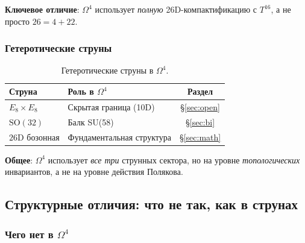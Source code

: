 \documentclass[11pt,a4paper]{article}
\newcommand{\SO}{\ensuremath{\mathrm{SO}}}
\newcommand{\Om}{\ensuremath{\Omega^4}}
\theoremstyle{definition}
\begin{document}
\medskip\noindent
\textbf{Ключевое отличие}: $\Om$ использует \emph{полную}
26D-компактификацию с $T^{16}$, а не просто $26 = 4 + 22$.

\subsubsection{Гетеротические струны}

\begin{table}[ht]
\centering
\caption{Гетеротические струны в \texorpdfstring{$\Om$}{}.}
\label{tab:string-heterotic}
\begin{tabular}{llc}
\toprule
Струна & Роль в $\Om$ & Раздел \\
\midrule
$E_8 \times E_8$ & Скрытая граница (10D) & \S\ref{sec:open} \\
$\SO(32)$ & Балк SU(58) & \S\ref{sec:bi} \\
$26$D бозонная & Фундаментальная структура & \S\ref{sec:math} \\
\bottomrule
\end{tabular}
\end{table}

\medskip\noindent
\textbf{Общее}: $\Om$ использует \emph{все три} струнных
сектора, но на уровне \emph{топологических} инвариантов,
а не на уровне действия Полякова.

\subsection{Структурные отличия: что не так, как в струнах}
\label{subsec:string-differences}

\subsubsection{Чего нет в \texorpdfstring{$\Om$}{}}
\end{document}
